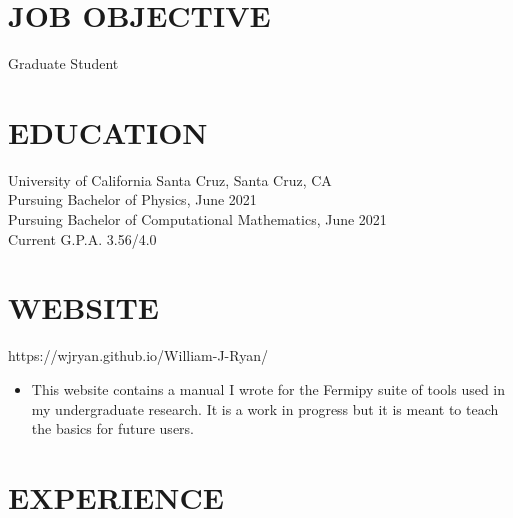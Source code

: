 \documentclass{res}
\begin{document}
 


\address{\bf  PRESENT ADDRESS\\522 14th ave.\\Santa Cruz, CA 95062\\(831) 428-6558}
                                  
\begin{resume}

\section{JOB OBJECTIVE}          
    Graduate Student 
 
\section{EDUCATION}          
    University of California Santa Cruz, Santa Cruz, CA  \\        
    Pursuing Bachelor of Physics, June 2021   \\ 
    Pursuing Bachelor of Computational Mathematics, June 2021	  \\              
    Current G.P.A. 3.56/4.0        

\section{WEBSITE}
	https://wjryan.github.io/William-J-Ryan/
	\begin{itemize}
	\item This website contains a manual I wrote for the Fermipy suite of tools used in my undergraduate research. It is a work in progress but it is meant to teach the basics for future users.
	\end{itemize}
 
\section{EXPERIENCE}
   \vspace{-0.1in}	


\end{resume}
\end{document}
